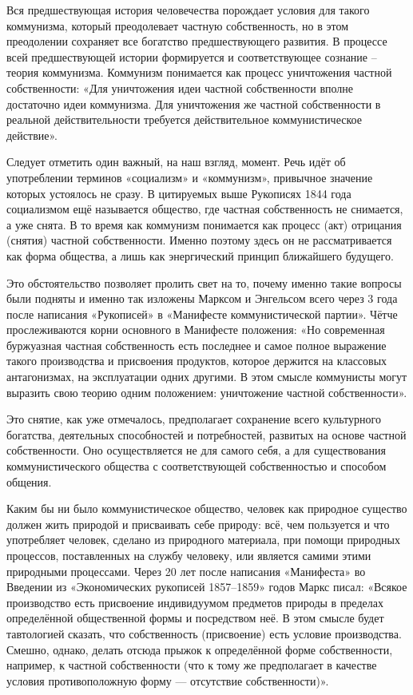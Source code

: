\documentclass[../main]{subfiles}
\begin{document}
Вся предшествующая история человечества порождает условия для такого коммунизма, который преодолевает частную собственность, но в этом преодолении сохраняет все богатство предшествующего развития. В процессе всей предшествующей истории формируется и соответствующее сознание – теория коммунизма. Коммунизм понимается как процесс уничтожения частной собственности: «Для уничтожения идеи частной собственности вполне достаточно идеи коммунизма. Для уничтожения же частной собственности в реальной действительности требуется действительное коммунистическое действие».

Следует отметить один важный, на наш взгляд, момент. Речь идёт об употреблении терминов «социализм» и «коммунизм», привычное значение которых устоялось не сразу. В цитируемых выше Рукописях 1844 года социализмом ещё называется общество, где частная собственность не снимается, а уже снята. В то время как коммунизм понимается как процесс (акт) отрицания (снятия) частной собственности. Именно поэтому здесь он не рассматривается как форма общества, а лишь как энергический принцип ближайшего будущего.

Это обстоятельство позволяет пролить свет на то, почему именно такие вопросы были подняты и именно так изложены Марксом и Энгельсом всего через 3 года после написания «Рукописей» в «Манифесте коммунистической партии». Чётче прослеживаются корни основного в Манифесте положения: «Но современная буржуазная частная собственность есть последнее и самое полное выражение такого производства и присвоения продуктов, которое держится на классовых антагонизмах, на эксплуатации одних другими. В этом смысле коммунисты могут выразить свою теорию одним положением: уничтожение частной собственности».

Это снятие, как уже отмечалось, предполагает сохранение всего культурного богатства, деятельных способностей и потребностей, развитых на основе частной собственности. Оно осуществляется не для самого себя, а для существования коммунистического общества с соответствующей собственностью и способом общения.

Каким бы ни было коммунистическое общество, человек как природное существо должен жить природой и присваивать себе природу: всё, чем пользуется и что употребляет человек, сделано из природного материала, при помощи природных процессов, поставленных на службу человеку, или является самими этими природными процессами. Через 20 лет после написания «Манифеста» во Введении из «Экономических рукописей 1857–1859» годов Маркс писал: «Всякое производство есть присвоение индивидуумом предметов природы в пределах определённой общественной формы и посредством неё. В этом смысле будет тавтологией сказать, что собственность (присвоение) есть условие производства. Смешно, однако, делать отсюда прыжок к определённой форме собственности, например, к частной собственности (что к тому же предполагает в качестве условия противоположную форму — отсутствие собственности)».
\end{document}
